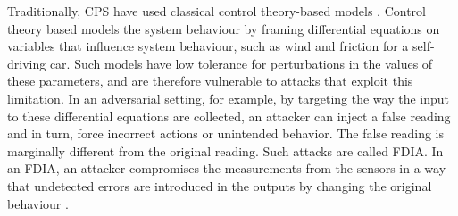 Traditionally, CPS have used classical control theory-based models  \cite{1337806} \cite{10.1145/2038642.2038667} \cite{6051465}. Control theory based models the system behaviour by framing differential equations on variables that influence system behaviour, such as wind and friction for a self-driving car.
Such models have low tolerance for perturbations in the values of these parameters, and are therefore vulnerable to attacks that exploit this limitation. %
 In an adversarial setting, for example, by targeting the way the input to these differential equations are collected, an attacker can inject a false reading and in turn, force incorrect actions or unintended behavior. The false reading is marginally different from the original reading. Such attacks are called \ac{FDIA}. In an \ac{FDIA}, an attacker compromises the measurements from the sensors in a way that undetected errors are introduced in the outputs by changing the original behaviour \cite{7438916}. 




